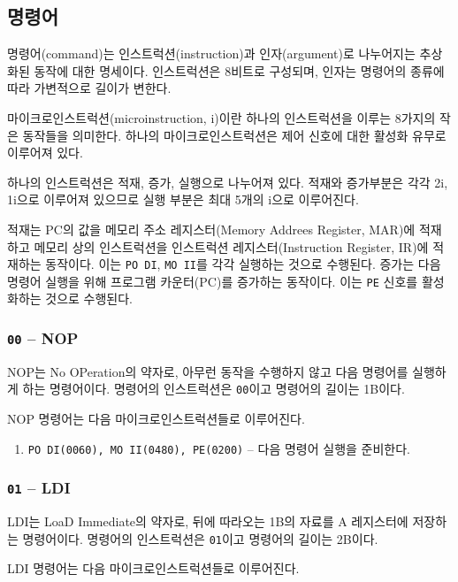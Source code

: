 \documentclass{article}
\begin{document}
\subsection{명령어}

명령어(command)는 인스트럭션(instruction)과
인자(argument)로 나누어지는 추상화된 동작에 대한 명세이다.
인스트럭션은 8비트로 구성되며, 인자는 명령어의 종류에 따라
가변적으로 길이가 변한다.

마이크로인스트럭션(microinstruction, \textmu i)이란
하나의 인스트럭션을 이루는 8가지의 작은 동작들을 의미한다.
하나의 마이크로인스트럭션은 제어 신호에 대한 활성화 유무로 이루어져 있다.

하나의 인스트럭션은 적재, 증가, 실행으로 나누어져 있다.
적재와 증가부분은 각각 2\textmu i, 1\textmu i으로 이루어져 있으므로
실행 부분은 최대 5개의 \textmu i으로 이루어진다.

적재는 PC의 값을 메모리 주소 레지스터(Memory Addrees Register, MAR)에
적재하고 메모리 상의 인스트럭션을 인스트럭션 레지스터(Instruction Register, IR)에
적재하는 동작이다. 이는 \texttt{PO DI}, \texttt{MO II}를 각각 실행하는 것으로 수행된다.
증가는 다음 명령어 실행을 위해 프로그램 카운터(PC)를 증가하는 동작이다.
이는 \texttt{PE} 신호를 활성화하는 것으로 수행된다.

\subsubsection{\texttt{00} -- NOP}

NOP는 No OPeration의 약자로, 아무런 동작을 수행하지 않고
다음 명령어를 실행하게 하는 명령어이다.
명령어의 인스트럭션은 \texttt{00}이고 명령어의 길이는 1B이다.

NOP 명령어는 다음 마이크로인스트럭션들로 이루어진다.

\begin{enumerate}
    \item \texttt{PO DI(0060), MO II(0480), PE(0200)} -- 다음 명령어 실행을 준비한다.
\end{enumerate}

\subsubsection{\texttt{01} -- LDI}

LDI는 LoaD Immediate의 약자로, 뒤에 따라오는 1B의 자료를
A 레지스터에 저장하는 명령어이다.
명령어의 인스트럭션은 \texttt{01}이고 명령어의 길이는 2B이다.

LDI 명령어는 다음 마이크로인스트럭션들로 이루어진다.
\end{document}
